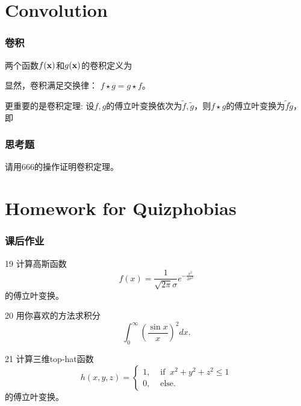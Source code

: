 \documentclass[CJK,13pt]{beamer}
\begin{document}
\section{Convolution}


\begin{frame}
  \frametitle{卷积}
  
  
  两个函数$f({\mathbf{x}})$和$g({\mathbf{x}})$的卷积定义为

  显然，卷积满足交换律： {\blue $f\star g = g\star f$}。

  更重要的是卷积定理: 设$f,g$的傅立叶变换依次为$\widetilde{f},\widetilde{g}$，则$f\star g$的傅立叶变换为$\widetilde{f}\widetilde{g}$，即
  
 \end{frame}


\begin{frame}
  \frametitle{思考题}
  
  请用666的操作证明卷积定理。
  
 \end{frame}




\section{Homework for Quizphobias}

\begin{frame}
  \frametitle{课后作业}
  
  \bitem
\item[19]{计算高斯函数$$f(x) = \frac{1}{\sqrt{2\pi}\sigma} e^{-\frac{x^2}{2\sigma^2}}$$
的傅立叶变换。}
\item[20]{用你喜欢的方法求积分
  $$\int_0^\infty \left(\frac{\sin x}{x}\right)^2dx . $$}
\item[21]{计算三维top-hat函数
  \begin{equation}
    h(x,y,z) = \left\{
    \begin{array}{ll}
      1, & \text{ if }\ x^2+y^2+z^2 \le 1 \\
      0, & \text{ else.}
    \end{array}
    \right. \nonumber
  \end{equation}
  的傅立叶变换。}  
  \eitem
  
\end{frame}


\ech
\end{document}
